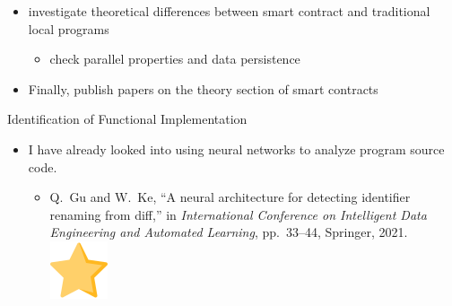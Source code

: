 \documentclass[xcolor=svgnames]{beamer}
\begin{document}
\begin{frame}[t]
\begin{itemize}
\item<5-> investigate theoretical differences between smart contract and traditional local programs
	\begin{itemize}
	\item check parallel properties and data persistence
	\end{itemize}
\item<6-> Finally, publish papers on the theory section of smart contracts
\end{itemize}
\end{frame}


\begin{frame}[t]{Identification of Functional Implementation}
\begin{itemize}
\item I have already looked into using neural networks to analyze program source code.
	\begin{itemize}
	\item Q.~Gu and W.~Ke, ``A neural architecture for detecting identifier renaming from diff,'' in {\em International Conference on Intelligent Data Engineering and Automated Learning}, pp.~33--44, Springer, 2021.~\includegraphics[height=2ex, angle=20,origin=c, ]{favourite.png}
	\end{itemize}


\end{itemize}
\end{frame}
\end{document}
